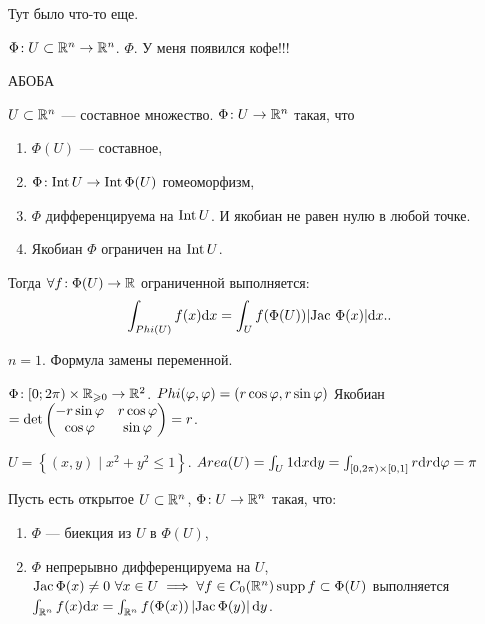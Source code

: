 Тут было что-то еще.
\begin{remark}
    $\Phi\!: U \subset \mathbb{R}^n \to \mathbb{R}^n$.  $\Phi$. У меня появился кофе!!!
\end{remark}
АБОБА
\begin{theorem}
    $U \subset \mathbb{R}^n$ --- составное множество.  $\Phi\!: U \to \mathbb{R}^n$ такая, что
     \begin{enumerate}
        \item $\Phi(U)$ --- составное,
        \item  $\Phi\!: \operatorname{Int} U \to \operatorname{Int} \Phi(U)$ гомеоморфизм,
        \item  $\Phi$ дифференцируема на  $\operatorname{Int} U$. И якобиан не равен нулю в любой точке.
        \item Якобиан  $\Phi$ ограничен на  $\operatorname{Int} U$.
    \end{enumerate}

    Тогда $\forall f\!:\Phi(U) \to \mathbb{R}$ ограниченной выполняется:
     \[
         \int_{Phi(U)} f(x) \mathrm{d}x = \int_U f(\Phi(U)) |\text{Jac}\ \Phi(x)| \mathrm{d}x.
    .\] 
\end{theorem}
\begin{example}
    $n = 1$. Формула замены переменной.
\end{example}
\begin{example}
    $\Phi\!: [0; 2\pi) \times \mathbb{R}_{\geqslant 0} \to \mathbb{R}^2$. $Phi(\varphi, \varphi) = (r  \cos \varphi, r  \sin \varphi)$
    Якобиан $= \det \begin{pmatrix} -r  \sin \varphi & r  \cos \varphi \\ \cos \varphi & \sin \varphi \end{pmatrix} = r$.

    $U = \left\{ (x, y) \mid x^2 + y^2 \le  1 \right\}$. $Area(U) = \int_U 1\mathrm{d}x\mathrm{d}y = \int_{[0, 2\pi) \times [0, 1]} r \mathrm{d}r \mathrm{d}\varphi = \pi$
\end{example}
\begin{theorem}
    Пусть есть открытое $U \subset \mathbb{R}^n$,  $\Phi\!: U \to  \mathbb{R}^n$ такая, что:
    \begin{enumerate}
        \item $\Phi$ --- биекция из  $U$ в  $\Phi(U)$,
        \item  $\Phi$ непрерывно дифференцируема на $U$,  $\operatorname{Jac} \Phi(x) \neq 0\ \forall x \in U \implies \forall f \in C_0(\mathbb{R}^n) \operatorname{supp} f \subset \Phi(U)$  выполняется $\int_{\mathbb{R}^n} f(x) \mathrm{d}x = \int_{\mathbb{R}^n} f(\Phi(x)) \left| \operatorname{Jac} \Phi(y) \right| \mathrm{d}y$.
    \end{enumerate}
\end{theorem}
